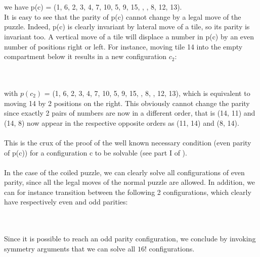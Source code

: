 \begin{fifteen}
\end{fifteen}
\\
\\
we have p(c) = (1, 6, 2, 3, 4, 7, 10, 5, 9, 15,  \black, , 8\black, 12, 13).
\\
It is easy to see that the parity of p(c) cannot change by a legal move of the puzzle. Indeed, p(c) is clearly invariant by lateral move of a tile, so its parity is invariant too. A vertical move of a tile will displace a number in p(c) by an even number of positions right or left. For instance, moving tile 14 into the empty compartment below it results in a new configuration $c_{2}$:

\begin{fifteen}
\end{fifteen}
\\
\\
with $p(c_{2})$ = (1, 6, 2, 3, 4, 7, 10, 5, 9, 15, , 8\black, \black, 12, 13), which is equivalent to moving 14 by 2 positions on the right. This obviously cannot change the parity since exactly 2 pairs of numbers are now in a different order, that is (14, 11) and (14, 8) now appear in the respective opposite orders as (11, 14) and (8, 14).
\\
\\
This is the crux of the proof of the well known necessary condition (even parity of p(c)) for a configuration c to be solvable (see part I of \cite{Johnson1879}).
\\
\\
In the case of the coiled puzzle, we can clearly solve all configurations of even parity, since all the legal moves of the normal puzzle are allowed. In addition, we can for instance transition between the following 2 configurations, which clearly have respectively even and odd parities:

\begin{fifteen}
\centering
{}
\end{fifteen}
%
\begin{fifteen}
\end{fifteen}
\\
\\
Since it is possible to reach an odd parity configuration, we conclude by invoking symmetry arguments that we can solve all $16!$ configurations. 


